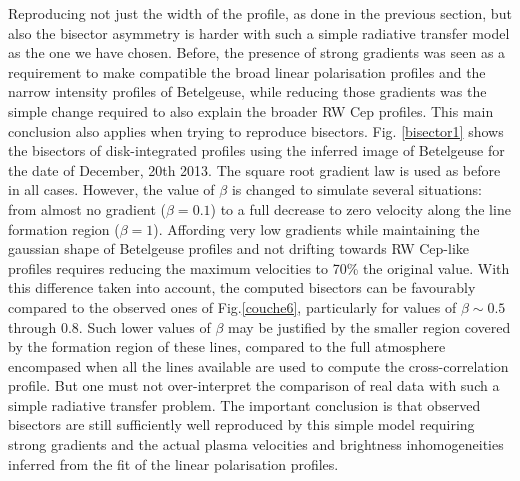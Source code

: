 \documentclass{/Users/art2/TeX/aanda/aa}
\begin{document}
Reproducing not just the width of the profile, as done in the previous section, but also the bisector asymmetry is harder with such 
a simple radiative transfer model as the one  we  have chosen. Before, the presence of strong gradients was seen as a requirement to make 
compatible the broad linear polarisation profiles and the narrow intensity profiles of Betelgeuse, while reducing those gradients was the
simple change  required to also explain the broader RW Cep profiles. This main conclusion also applies when trying to reproduce bisectors.
 Fig. \ref{bisector1} shows 
the bisectors of disk-integrated profiles using the inferred image of Betelgeuse for the date of December, 20th 2013. The square root gradient law
is used as before in all cases. However, the value of $\beta$ is changed to simulate several situations: from almost no gradient ($\beta=0.1$) to a
 full decrease to zero  velocity along the line formation region ($\beta=1$). Affording very low gradients while maintaining the gaussian shape 
 of Betelgeuse profiles and not drifting towards 
RW Cep-like profiles requires reducing the maximum velocities to 70\% the original value. With this difference taken into account, 
the computed bisectors can be favourably compared to the observed ones of Fig.\ref{couche6}, particularly for values of $\beta \sim 0.5$ through $0.8$. 
Such lower values of $\beta$ may be justified by the smaller region covered by the formation region of these lines, compared to the full atmosphere 
encompased when all the lines available are used to compute the cross-correlation profile. But one must 
not over-interpret the comparison of real data with such a simple radiative transfer problem. The important conclusion is that 
observed bisectors are still sufficiently well reproduced by this simple model requiring strong gradients and the actual plasma velocities 
and brightness inhomogeneities inferred from the fit of the linear polarisation profiles. 
\end{document}
